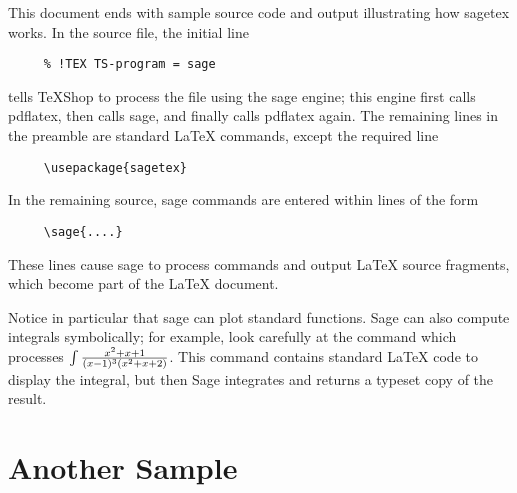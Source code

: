 \documentclass[11pt, oneside]{amsart}
\begin{document}
This document ends with sample source code and output illustrating how sagetex works.
 In the source file, the initial line
\begin{verbatim}
     % !TEX TS-program = sage
\end{verbatim}
tells TeXShop to process the file using the sage engine; this engine first calls pdflatex, then calls sage, and finally calls pdflatex again.
The remaining lines in the preamble are standard LaTeX commands, except the required line
\begin{verbatim}
     \usepackage{sagetex}
\end{verbatim}
In the remaining source, sage commands are entered within lines of the form
\begin{verbatim}
     \sage{....}
\end{verbatim}
These lines cause sage to process commands and output LaTeX source fragments, which become part of the LaTeX document.

Notice in particular that sage can plot standard functions. Sage can also compute integrals symbolically; for example, look carefully at the command which processes $\int {{x^2 + x + 1} \over {(x - 1)^3 (x^2 + x + 2)}}$. This command contains standard LaTeX code to display the integral, but then Sage integrates and returns a typeset copy of the result.


%
%
%

\section{Another Sample}
\end{document}

